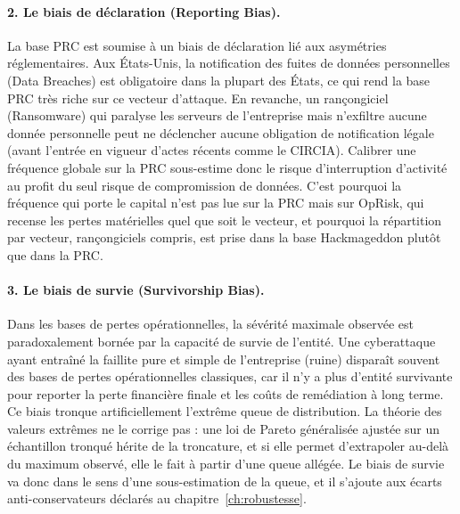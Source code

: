 \paragraph{2. Le biais de déclaration (Reporting Bias).}
La base PRC est soumise à un biais de déclaration lié aux asymétries réglementaires. Aux États-Unis, la notification des fuites de données personnelles (Data Breaches) est obligatoire dans la plupart des États, ce qui rend la base PRC très riche sur ce vecteur d'attaque. En revanche, un rançongiciel (Ransomware) qui paralyse les serveurs de l'entreprise mais n'exfiltre aucune donnée personnelle peut ne déclencher aucune obligation de notification légale (avant l'entrée en vigueur d'actes récents comme le CIRCIA).
Calibrer une fréquence globale sur la PRC sous-estime donc le risque d'interruption
d'activité au profit du seul risque de compromission de données. C'est pourquoi la fréquence
qui porte le capital n'est pas lue sur la PRC mais sur OpRisk, qui recense les pertes matérielles
quel que soit le vecteur, et pourquoi la répartition par vecteur, rançongiciels compris, est prise
dans la base Hackmageddon plutôt que dans la PRC.

\paragraph{3. Le biais de survie (Survivorship Bias).}
Dans les bases de pertes opérationnelles, la sévérité maximale observée est paradoxalement bornée par la capacité de survie de l'entité. Une cyberattaque ayant entraîné la faillite pure et simple de l'entreprise (ruine) disparaît souvent des bases de pertes opérationnelles classiques, car il n'y a plus d'entité survivante pour reporter la perte financière finale et les coûts de remédiation à long terme. Ce biais tronque artificiellement l'extrême queue de distribution. La théorie des valeurs
extrêmes ne le corrige pas : une loi de Pareto généralisée ajustée sur un échantillon tronqué
hérite de la troncature, et si elle permet d'extrapoler au-delà du maximum observé, elle le fait
à partir d'une queue allégée. Le biais de survie va donc dans le sens d'une sous-estimation de la
queue, et il s'ajoute aux écarts anti-conservateurs déclarés au chapitre~\ref{ch:robustesse}.



